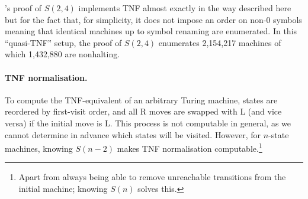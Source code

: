 \CoqBB's proof of $S(2,4)$ implements TNF almost exactly in the way described here but for the fact that, for simplicity, it does not impose an order on non-0 symbols meaning that identical machines up to symbol renaming are enumerated. In this ``quasi-TNF'' setup, the proof of $S(2,4)$ enumerates 2,154,217 machines of which 1,432,880 are nonhalting.





\paragraph{TNF normalisation.} To compute the TNF-equivalent of an arbitrary Turing machine, states are reordered by first-visit order, and all R moves are swapped with L (and vice versa) if the initial move is L. This process is not computable in general, as we cannot determine in advance which states will be visited. However, for $n$-state machines, knowing $S(n-2)$ makes TNF normalisation computable.\footnote{Apart from always being able to remove unreachable transitions from the initial machine; knowing $S(n)$ solves this. } %

